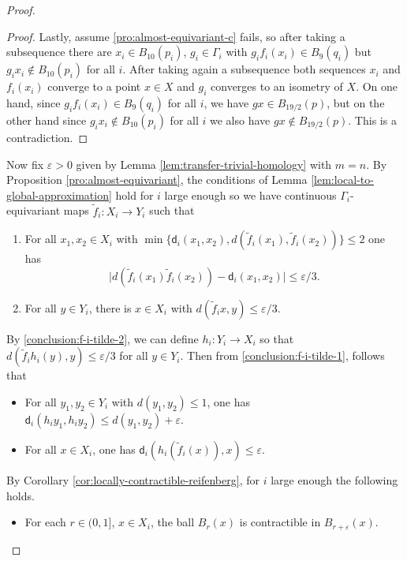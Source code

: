 \documentclass[12pt]{amsart}
\theoremstyle{definition}
\numberwithin{equation}{section}
\begin{document}
\begin{proof}
\begin{proof}
Lastly, assume  \eqref{pro:almost-equivariant-c} fails, so after taking a subsequence there are $x_i \in B_{10}(p_i)$, $g_i \in \Gamma_i$ with $g_i f_i (x_i)  \in B_{9}(q_i) $ but $ g_i x_i  \not\in  B_{10}(p_i) $ for all $i$. After taking again a subsequence both sequences  $x_i$ and $f_i (x_i)$ converge to a point $x \in X$ and $g_i$ converges to an isometry of $X$. On one hand, since $g_i f_i (x_i) \in B_9(q_i)$ for all $i$, we have $gx \in B_{19/2} (p)$, but on the other hand since $g_i x_i \not\in B_{10}(p_i)$ for all $i$ we also have $gx \not\in B _{19/2}(p)$. This is a contradiction.
\end{proof}

Now fix $\varepsilon  > 0 $ given by Lemma \ref{lem:transfer-trivial-homology} with $m = n $. By Proposition \ref{pro:almost-equivariant}, the conditions of Lemma \ref{lem:local-to-global-approximation} hold for $i$ large enough so we have continuous $\Gamma_i$-equivariant maps $\tilde{f}_i : X_i \to Y_i $ such that 
 \begin{enumerate}[1.]
     \item For all $x_1, x_2 \in X_i$ with $\min \{ \mathsf{d}_i(x_1, x_2) ,  d(\tilde{f}_i (x_1),\tilde{f}_i (x_2)) \}  \leq 2 $  one has 
     \[   \vert d ( \tilde {f}_i (x_1) \tilde{f} _i (x_2) ) - \mathsf{d}_i(x_1, x_2) \vert \leq \varepsilon /3.     \] \label{conclusion:f-i-tilde-1}
     \item  For all $y \in Y_i$, there is $x \in X_i$ with $d ( \tilde{f} _i x , y ) \leq \varepsilon / 3$.\label{conclusion:f-i-tilde-2}
 \end{enumerate}
By \eqref{conclusion:f-i-tilde-2}, we can define $h_i : Y_i \to  X_i $ so that $d ( \tilde{f}_i h_ i (y) , y ) \leq \varepsilon / 3 $ for all $y \in Y_i$. Then from \eqref{conclusion:f-i-tilde-1}, follows that
\begin{itemize}
    \item For all $y_1, y_2 \in Y_i$ with $d(y_1, y_2) \leq 1$, one has $\mathsf{d}_i( h_i y_1, h_i y_2 ) \leq d( y_1 , y_2 ) + \varepsilon $.
    \item  For all $x \in X_i$, one has $\mathsf{d}_i(h_i(\tilde{f}_i(x)), x) \leq \varepsilon$.
\end{itemize}
By Corollary \ref{cor:locally-contractible-reifenberg}, for $i$ large enough the following holds.
\begin{itemize}
    \item For each $r \in ( 0 , 1 ]$, $x \in X_i$, the ball $B_r(x)$ is contractible in $B_{r + \varepsilon }(x )$.
\end{itemize}

\end{proof}
\end{document}
